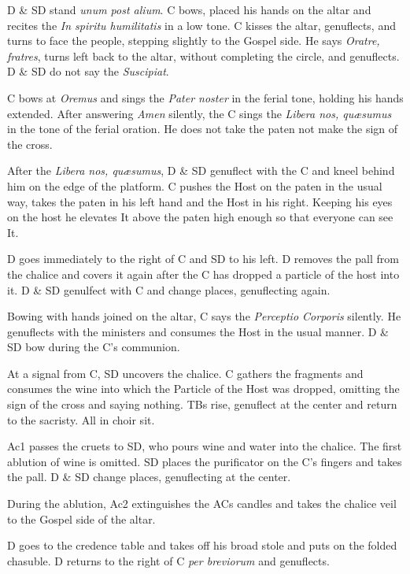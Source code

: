 {    \rubric D \& SD stand \textit{unum post alium}. C bows, placed his hands
    on the altar and recites the \textit{In spiritu humilitatis} in a low tone.
    C kisses the altar, genuflects, and turns to face the people, stepping
    slightly to the Gospel side. He says \textit{Oratre, fratres}, turns left
    back to the altar, without completing the circle, and genuflects. D \& SD
    do not say the \textit{Suscipiat}.

    \rubric C bows at \textit{Oremus} and sings the \textit{Pater noster} in
    the ferial tone, holding his hands extended. After answering \textit{Amen}
    silently, the C sings the \textit{Libera nos, quæsumus} in the tone of the
    ferial oration. He does not take the paten not make the sign of the cross.

    \rubric After the \textit{Libera nos, quæsumus}, D \& SD genuflect with
    the C and kneel behind him on the edge of the platform. C pushes the Host
    on the paten in the usual way, takes the paten in his left hand and the
    Host in his right. Keeping his eyes on the host he elevates It above the
    paten high enough so that everyone can see It.

    \rubric D goes immediately to the right of C and SD to his left. D removes
    the pall from the chalice and covers it again after the C has dropped a
    particle of the host into it. D \& SD genulfect with C and change places,
    genuflecting again.

    \rubric Bowing with hands joined on the altar, C says the \textit{Perceptio
    Corporis} silently. He genuflects with the ministers and consumes the Host
    in the usual manner. D \& SD bow during the C's communion.

    \rubric At a signal from C, SD uncovers the chalice. C gathers the
    fragments and consumes the wine into which the Particle of the Host was
    dropped, omitting the sign of the cross and saying nothing. TBs rise,
    genuflect at the center and return to the sacristy. All in choir sit.

    \rubric Ac1 passes the cruets to SD, who pours wine and water into the
    chalice. The first ablution of wine is omitted. SD places the purificator
    on the C's fingers and takes the pall. D \& SD change places, genuflecting
    at the center.

    \rubric During the ablution, Ac2 extinguishes the ACs candles and takes the
    chalice veil to the Gospel side of the altar.

    \rubric D goes to the credence table and takes off his broad stole and puts
    on the folded chasuble. D returns to the right of C \textit{per breviorum}
    and genuflects.

}
